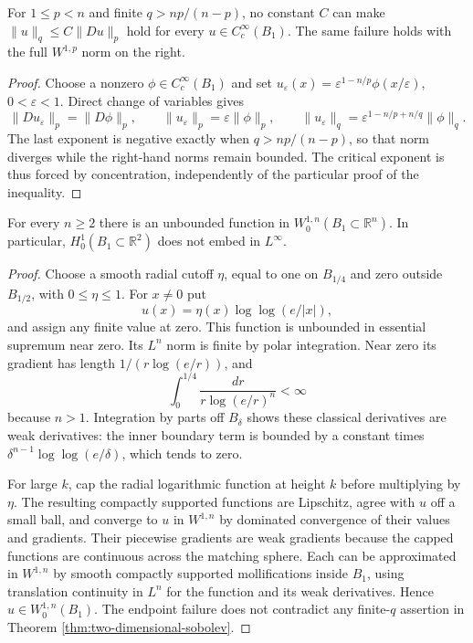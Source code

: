 \begin{example}\label{ex:sobolev-exponent-obstruction}
For $1\leq p<n$ and finite $q>np/(n-p)$, no constant $C$ can make $\|u\|_q\leq C\|Du\|_p$ hold for every $u\in C_c^\infty(B_1)$. The same failure holds with the full $W^{1,p}$ norm on the right.
\end{example}
\begin{proof}
Choose a nonzero $\phi\in C_c^\infty(B_1)$ and set $u_\varepsilon(x)=\varepsilon^{1-n/p}\phi(x/\varepsilon)$, $0<\varepsilon<1$. Direct change of variables gives
\[
 \|Du_\varepsilon\|_p=\|D\phi\|_p,\qquad
 \|u_\varepsilon\|_p=\varepsilon\|\phi\|_p,\qquad
 \|u_\varepsilon\|_q=\varepsilon^{1-n/p+n/q}\|\phi\|_q.
\]
The last exponent is negative exactly when $q>np/(n-p)$, so that norm diverges while the right-hand norms remain bounded. The critical exponent is thus forced by concentration, independently of the particular proof of the inequality.
\end{proof}

\begin{example}\label{ex:critical-sobolev-unbounded}
For every $n\geq2$ there is an unbounded function in $W^{1,n}_0(B_1\subset\mathbb R^n)$. In particular, $H_0^1(B_1\subset\mathbb R^2)$ does not embed in $L^\infty$.
\end{example}
\begin{proof}
Choose a smooth radial cutoff $\eta$, equal to one on $B_{1/4}$ and zero outside $B_{1/2}$, with $0\leq\eta\leq1$. For $x\ne0$ put
\[
 u(x)=\eta(x)\log\log(e/|x|),
\]
and assign any finite value at zero. This function is unbounded in essential supremum near zero. Its $L^n$ norm is finite by polar integration. Near zero its gradient has length $1/(r\log(e/r))$, and
\[
 \int_0^{1/4}\frac{dr}{r\log(e/r)^n}<\infty
\]
because $n>1$. Integration by parts off $B_\delta$ shows these classical derivatives are weak derivatives: the inner boundary term is bounded by a constant times $\delta^{n-1}\log\log(e/\delta)$, which tends to zero.

For large $k$, cap the radial logarithmic function at height $k$ before multiplying by $\eta$. The resulting compactly supported functions are Lipschitz, agree with $u$ off a small ball, and converge to $u$ in $W^{1,n}$ by dominated convergence of their values and gradients. Their piecewise gradients are weak gradients because the capped functions are continuous across the matching sphere. Each can be approximated in $W^{1,n}$ by smooth compactly supported mollifications inside $B_1$, using translation continuity in $L^n$ for the function and its weak derivatives. Hence $u\in W^{1,n}_0(B_1)$. The endpoint failure does not contradict any finite-$q$ assertion in Theorem \ref{thm:two-dimensional-sobolev}.
\end{proof}
